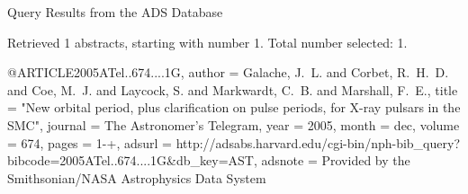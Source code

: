 Query Results from the ADS Database


Retrieved 1 abstracts, starting with number 1.  Total number selected: 1.

@ARTICLE{2005ATel..674....1G,
   author = {{Galache}, J.~L. and {Corbet}, R.~H.~D. and {Coe}, M.~J. and 
	{Laycock}, S. and {Markwardt}, C.~B. and {Marshall}, F.~E.},
    title = "{New orbital period, plus clarification on pulse periods, for X-ray pulsars in the SMC}",
  journal = {The Astronomer's Telegram},
     year = 2005,
    month = dec,
   volume = 674,
    pages = {1-+},
   adsurl = {http://adsabs.harvard.edu/cgi-bin/nph-bib_query?bibcode=2005ATel..674....1G&db_key=AST},
  adsnote = {Provided by the Smithsonian/NASA Astrophysics Data System}
}


